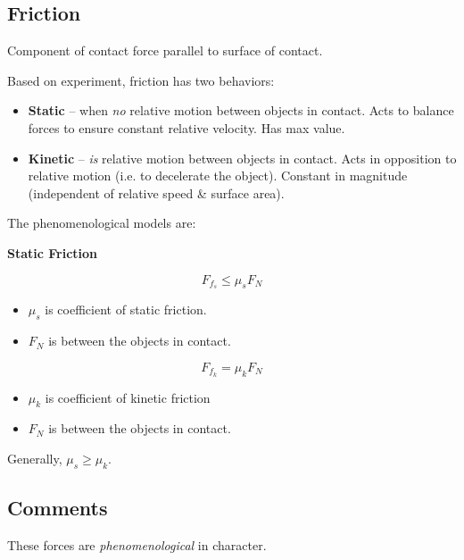 \subsection{Friction}

Component of contact force parallel to surface of contact.

Based on experiment, friction has two behaviors:

\begin{itemize}
	\item \textbf{Static} -- when \textit{no} relative motion between objects in contact. Acts to balance forces to ensure constant relative velocity. Has max value.
	\item \textbf{Kinetic} -- \textit{is} relative motion between objects in contact. Acts in opposition to relative motion (i.e. to decelerate the object). Constant in magnitude (independent of relative speed \& surface area).
\end{itemize}

The phenomenological models are:

\textbf{Static Friction}

\begin{equation}
	F_{f_s} \leq \mu_s F_N
\end{equation}

\begin{itemize}
	\item $\mu_s$ is coefficient of static friction.
	\item $F_N$ is between the objects in contact.
\end{itemize}

\begin{equation}
	F_{f_k} = \mu_k F_N
\end{equation}

\begin{itemize}
	\item $\mu_k$ is coefficient of kinetic friction
	\item $F_N$ is between the objects in contact.
\end{itemize}

\begin{remark}
	Generally, $\mu_s \geq \mu_k$.
\end{remark}

\subsection{Comments}

These forces are \textit{phenomenological} in character.

